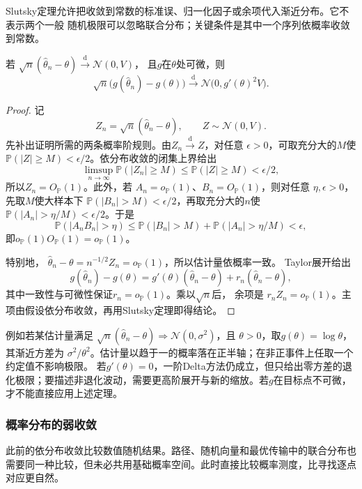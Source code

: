 Slutsky定理允许把收敛到常数的标准误、归一化因子或余项代入渐近分布。它不表示两个一般
随机极限可以忽略联合分布；关键条件是其中一个序列依概率收敛到常数。

\begin{theorem}[Delta方法]
\label{thm:statistics-delta-method}
若
\(\sqrt n(\widehat\theta_n-\theta)\xrightarrow{\mathrm d}\mathcal N(0,V)\)，
且\(g\)在\(\theta\)处可微，则
\[
  \sqrt n\bigl(g(\widehat\theta_n)-g(\theta)\bigr)
  \xrightarrow{\mathrm d}
  \mathcal N\bigl(0,g'(\theta)^2V\bigr).
\]
\end{theorem}

\begin{proof}
记
\[
  Z_n=\sqrt n(\widehat\theta_n-\theta),
  \qquad
  Z\sim\mathcal N(0,V).
\]
先补出证明所需的两条概率阶规则。由\(Z_n\xrightarrow{\mathrm d}Z\)，对任意
\(\epsilon>0\)，可取充分大的\(M\)使
\(\mathbb{P}(|Z|\geq M)<\epsilon/2\)。依分布收敛的闭集上界给出
\[
  \limsup_{n\to\infty}\mathbb{P}(|Z_n|\geq M)
  \leq \mathbb{P}(|Z|\geq M)<\epsilon/2,
\]
所以\(Z_n=O_{\mathbb{P}}(1)\)。此外，若
\(A_n=o_{\mathbb{P}}(1)\)、\(B_n=O_{\mathbb{P}}(1)\)，则对任意
\(\eta,\epsilon>0\)，先取\(M\)使大样本下
\(\mathbb{P}(|B_n|>M)<\epsilon/2\)，再取充分大的\(n\)使
\(\mathbb{P}(|A_n|>\eta/M)<\epsilon/2\)。于是
\[
  \mathbb{P}(|A_nB_n|>\eta)
  \leq
  \mathbb{P}(|B_n|>M)
  +\mathbb{P}(|A_n|>\eta/M)
  <\epsilon,
\]
即\(o_{\mathbb{P}}(1)O_{\mathbb{P}}(1)=o_{\mathbb{P}}(1)\)。

特别地，
\(\widehat\theta_n-\theta=n^{-1/2}Z_n=o_{\mathbb{P}}(1)\)，所以估计量依概率一致。
Taylor展开给出
\[
  g(\widehat\theta_n)-g(\theta)
  =g'(\theta)(\widehat\theta_n-\theta)
   +r_n(\widehat\theta_n-\theta),
\]
其中一致性与可微性保证\(r_n=o_{\mathbb{P}}(1)\)。乘以\(\sqrt n\)后，
余项是
\(r_nZ_n=o_{\mathbb{P}}(1)\)。主项由假设依分布收敛，再用Slutsky定理即得结论。
\end{proof}

例如若某估计量满足
\(\sqrt n(\widehat\theta_n-\theta)\Rightarrow\mathcal N(0,\sigma^2)\)，且
\(\theta>0\)，取\(g(\theta)=\log\theta\)，其渐近方差为
\(\sigma^2/\theta^2\)。估计量以趋于一的概率落在正半轴；在非正事件上任取一个约定值不影响极限。
若\(g'(\theta)=0\)，一阶Delta方法仍成立，但只给出零方差的退化极限；要描述非退化波动，需要更高阶展开与新的缩放。若\(g\)在目标点不可微，才不能直接应用上述定理。

\subsubsection{概率分布的弱收敛}
\label{sec:rv-weak-convergence}
此前的依分布收敛比较数值随机结果。路径、随机向量和最优传输中的联合分布也需要同一种比较，但未必共用基础概率空间。此时直接比较概率测度，比寻找逐点对应更自然。

